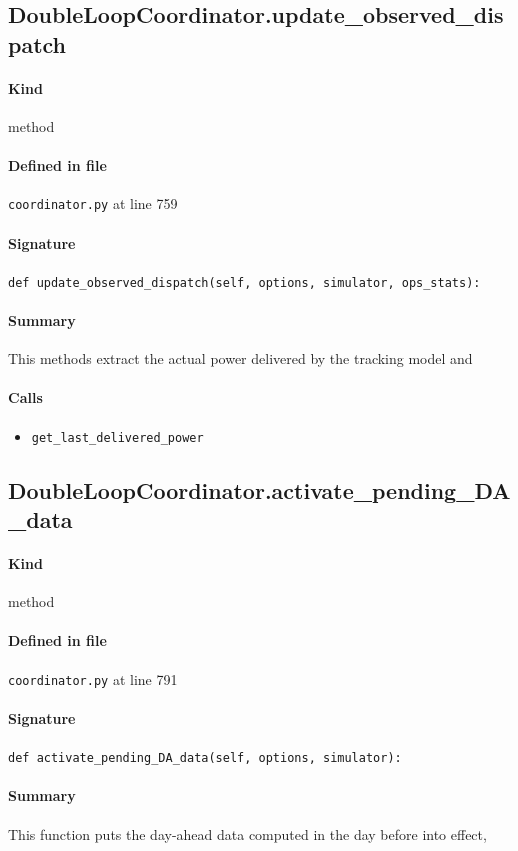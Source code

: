 \documentclass[11pt]{report}
\begin{document}
\subsection{DoubleLoopCoordinator.update\_observed\_dispatch}
\label{def:coordinator.py:DoubleLoopCoordinator.update_observed_dispatch:L759}
\paragraph{Kind} method
\paragraph{Defined in file} \texttt{coordinator.py} at line 759
\paragraph{Signature} \texttt{def update\_observed\_dispatch(self, options, simulator, ops\_stats):}
\paragraph{Summary} This methods extract the actual power delivered by the tracking model and
\paragraph{Calls}
\begin{itemize}[leftmargin=*]
  \item \texttt{get\_last\_delivered\_power}
\end{itemize}
\subsection{DoubleLoopCoordinator.activate\_pending\_DA\_data}
\label{def:coordinator.py:DoubleLoopCoordinator.activate_pending_DA_data:L791}
\paragraph{Kind} method
\paragraph{Defined in file} \texttt{coordinator.py} at line 791
\paragraph{Signature} \texttt{def activate\_pending\_DA\_data(self, options, simulator):}
\paragraph{Summary} This function puts the day-ahead data computed in the day before into effect,
\end{document}
